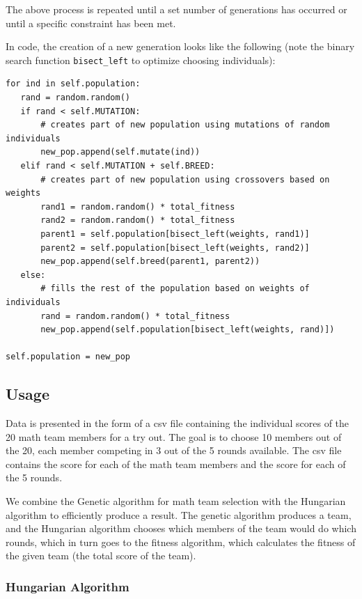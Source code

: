 \documentclass[11pt,a4paper]{article}
\begin{document}
The above process is repeated until a set number of generations has occurred or until a specific constraint has been met. 

In code, the creation of a new generation looks like the following (note the binary search function \verb|bisect_left| to optimize choosing individuals):

\begin{lstlisting}
for ind in self.population:
   rand = random.random()
   if rand < self.MUTATION:
       # creates part of new population using mutations of random individuals
       new_pop.append(self.mutate(ind))
   elif rand < self.MUTATION + self.BREED:
       # creates part of new population using crossovers based on weights
       rand1 = random.random() * total_fitness
       rand2 = random.random() * total_fitness
       parent1 = self.population[bisect_left(weights, rand1)]
       parent2 = self.population[bisect_left(weights, rand2)]
       new_pop.append(self.breed(parent1, parent2))
   else:
       # fills the rest of the population based on weights of individuals
       rand = random.random() * total_fitness
       new_pop.append(self.population[bisect_left(weights, rand)])

self.population = new_pop
\end{lstlisting}
\subsection{Usage} 
\label{Genetic Algorithms:Usage}

Data is presented in the form of a csv file containing the individual scores of the 20 math team members for a try out. The goal is to choose 10 members out of the 20, each member competing in 3 out of the 5 rounds available. The csv file contains the score for each of the math team members and the score for each of the 5 rounds.

We combine the Genetic algorithm for math team selection with the Hungarian algorithm to efficiently produce a result. The genetic algorithm produces a team, and the Hungarian algorithm chooses which members of the team would do which rounds, which in turn goes to the fitness algorithm, which calculates the fitness of the given team (the total score of the team).

\subsubsection{Hungarian Algorithm}
\label{Genetic Algorithms:Hungarian Algorithm}
\end{document}
